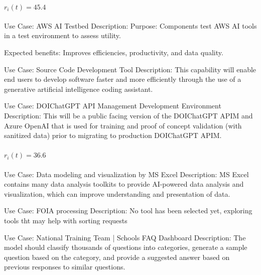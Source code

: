 \paragraph{$r_i(t) = 45.4$}
\begin{description}[style=nextline,leftmargin=1em,font=\normalfont\bfseries]
  \item[Anchor] Use Case: AWS AI Testbed
Description: Purpose: Components test AWS AI tools in a test environment to assess utility. 

Expected benefits: Improves efficiencies, productivity, and data quality.
  \item[Human-judged closer] Use Case: Source Code Development Tool
Description: This capability will enable end users to develop software faster and more efficiently through the use of a generative artificial intelligence coding assistant.  

  \item[Human-judged farther] Use Case: DOIChatGPT API Management Development Environment
Description:  This will be a public facing version of the DOIChatGPT APIM and Azure OpenAI that is used for training and proof of concept validation (with sanitized data) prior to migrating to production DOIChatGPT APIM.
\end{description}
\paragraph{$r_i(t) = 36.6$}
\begin{description}[style=nextline,leftmargin=1em,font=\normalfont\bfseries]
  \item[Anchor] Use Case: Data modeling and visualization by MS Excel
Description: MS Excel contains many data analysis toolkits to provide AI-powered data analysis and visualization, which can improve understanding and presentation of data. 
  \item[Human-judged closer] Use Case: FOIA processing
Description: No tool has been selected yet, exploring tools tht may help with sorting requests
  \item[Human-judged farther] Use Case: National Training Team | Schools  FAQ Dashboard
Description: The model should classify thousands of questions into categories, generate a sample question based on the category, and provide a suggested answer based on previous responses to similar questions.
\end{description}
